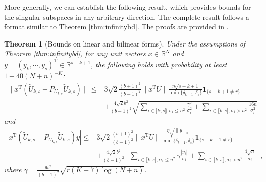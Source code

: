 \documentclass[reqno]{amsart}
\newcommand{\T}{\mathrm{T}}
\theoremstyle{plain}
\newtheorem{theorem}{Theorem}
\theoremstyle{definition}
\begin{document}
More generally, we can establish the following result, which provides bounds for the singular subspaces in any arbitrary direction. The complete result follows a format similar to Theorem \ref{thm:infinitybd}. The proofs are provided in \cite{WangSupp24}.
\begin{theorem}[Bounds on linear and bilinear forms] \label{thm:linearform}Under the assumptions of Theorem \ref{thm:infinitybd}, for any unit vectors $x \in \mathbb R^{N}$ and $y=(y_k,\cdots,y_s)^\T \in \mathbb R^{s-k+1}$, the following holds with probability at least $1 - 40(N+n)^{-K}$:
\begin{align*}
\|x^\T (\widetilde U_{k,s}-P_{U_{k,s}}\widetilde U_{k,s}) \|  \le & 3\sqrt{2}\frac{(b+1)^2}{(b-1)^2}  \|x^\T U\| \frac{\eta\sqrt{s-k+1}}{\min\{\delta_{k-1}, \delta_s\}}\mathbf{1}_{\{s-k+1\neq r \}} \\
& + \frac{4\sqrt{2} b^2}{(b-1)^2}   \sqrt{\sum_{i\in \llbracket k, s\rrbracket, \sigma_i\le n^2} \frac{\gamma^2}{\sigma_i^2} +  \sum_{i\in \llbracket k, s\rrbracket, \sigma_i> n^2} \frac{16 n}{\sigma_i^2} } 
\end{align*}
and
\begin{align}\label{eq:bilinearbd}
\left| x^\T (\widetilde U_{k,s}-P_{U_{k,s}}\widetilde U_{k,s}) y \right|\le & 3\sqrt{2} \frac{(b+1)^2}{(b-1)^2}  \| x^\T U\| \frac{\eta \sqrt{\|y\|_0}}{\min\{\delta_{k-1}, \delta_s\}}\mathbf{1}_{\{s-k+1\neq r \}}\nonumber\\
& + \frac{4\sqrt{2} b^2}{(b-1)^2} \left[\sum_{i\in \llbracket k, s\rrbracket, \sigma_i\le n^2}  {\gamma } \frac{|y_i|}{\sigma_i} +  \sum_{i\in \llbracket k, s\rrbracket, \sigma_i> n^2} \frac{4\sqrt{n}}{\sigma_i} \right],
\end{align}
where $\gamma= \frac{9 b^2}{(b-1)^2}\sqrt{r(K+7)\log(N+n)}$. 
\end{theorem}
\end{document}
